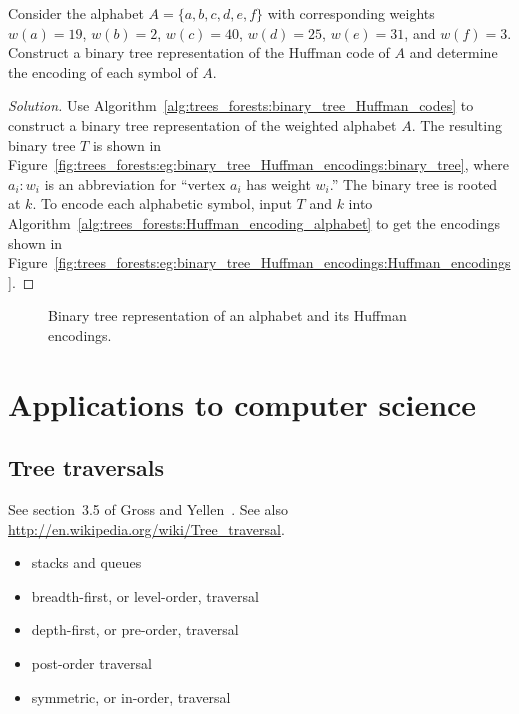 \begin{example}
Consider the alphabet $A = \{a, b, c, d, e, f\}$ with corresponding
weights $w(a) = 19$, $w(b) = 2$, $w(c) = 40$, $w(d) = 25$,
$w(e) = 31$, and $w(f) = 3$. Construct a binary tree representation of
the Huffman code of $A$ and determine the encoding of each symbol of
$A$.
\end{example}

\begin{proof}[Solution]
Use Algorithm~\ref{alg:trees_forests:binary_tree_Huffman_codes} to
construct a binary tree representation of the weighted alphabet
$A$. The resulting binary tree $T$ is shown in
Figure~\ref{fig:trees_forests:eg:binary_tree_Huffman_encodings:binary_tree},
where $a_i: w_i$ is an abbreviation for ``vertex $a_i$ has weight
$w_i$.'' The binary tree is rooted at $k$. To encode each alphabetic
symbol, input $T$ and $k$ into
Algorithm~\ref{alg:trees_forests:Huffman_encoding_alphabet} to get the
encodings shown in
Figure~\ref{fig:trees_forests:eg:binary_tree_Huffman_encodings:Huffman_encodings}.
\end{proof}

\begin{figure}[!htbp]
\centering

\caption{Binary tree representation of an alphabet and its Huffman encodings.}
\label{fig:trees_forests:eg:binary_tree_Huffman_encodings}
\end{figure}



\section{Applications to computer science}



\subsection{Tree traversals}

See section~3.5 of Gross and Yellen~\cite{GrossYellen1999}.
See also \url{http://en.wikipedia.org/wiki/Tree_traversal}.

\begin{itemize}
\item stacks and queues

\item breadth-first, or level-order, traversal

\item depth-first, or pre-order, traversal

\item post-order traversal

\item symmetric, or in-order, traversal
\end{itemize}

